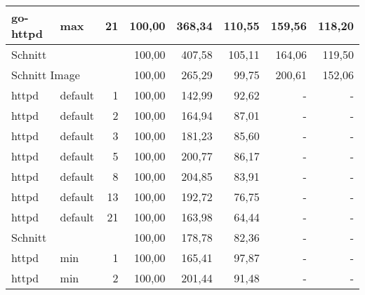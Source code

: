 \begin{footnotesize}
\begin{longtable}{llrrrrrr}
		go-httpd       & max     & 21         & 100,00 & 368,34                      & 110,55                      & 159,56                      & 118,20                      \\ \hline
		Schnitt        &         &            & 100,00 & 407,58                      & 105,11                      & 164,06                      & 119,50                      \\ \hline
		\multicolumn{2}{l}{Schnitt Image} &            & 100,00 & 265,29                      & 99,75                       & 200,61                      & 152,06                      \\ \hline
		httpd          & default & 1          & 100,00 & 142,99                      & 92,62                       & -                           & -                           \\
		httpd          & default & 2          & 100,00 & 164,94                      & 87,01                       & -                           & -                           \\
		httpd          & default & 3          & 100,00 & 181,23                      & 85,60                       & -                           & -                           \\
		httpd          & default & 5          & 100,00 & 200,77                      & 86,17                       & -                           & -                           \\
		httpd          & default & 8          & 100,00 & 204,85                      & 83,91                       & -                           & -                           \\
		httpd          & default & 13         & 100,00 & 192,72                      & 76,75                       & -                           & -                           \\
		httpd          & default & 21         & 100,00 & 163,98                      & 64,44                       & -                           & -                           \\ \hline
		Schnitt        &         &            & 100,00 & 178,78                      & 82,36                       & -                           & -                           \\ \hline
		httpd          & min     & 1          & 100,00 & 165,41                      & 97,87                       & -                           & -                           \\
		httpd          & min     & 2          & 100,00 & 201,44                      & 91,48                       & -                           & -                           \\

\end{longtable}
\end{footnotesize}
